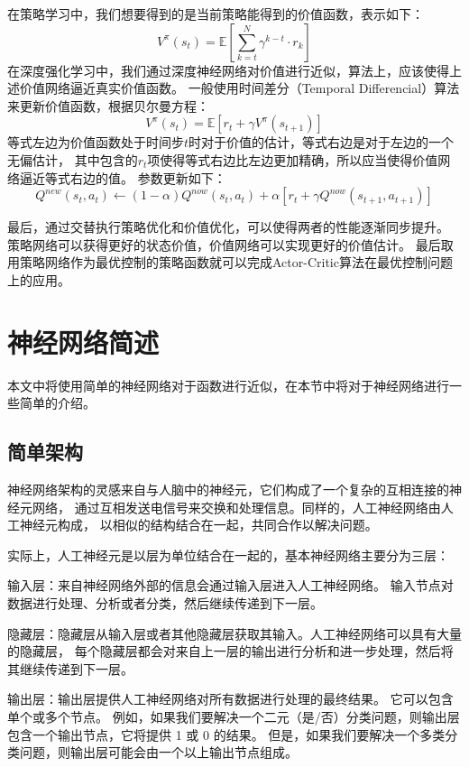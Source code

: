 \documentclass[AutoFakeBold]{LZUThesis}
\begin{document}
在策略学习中，我们想要得到的是当前策略能得到的价值函数，表示如下：
\begin{equation}
  V^\pi(s_t) = \mathbb{E} \left[ \sum_{k = t}^{N}
  \gamma^{k - t} \cdot r_k \right]
\end{equation}
在深度强化学习中，我们通过深度神经网络对价值进行近似，算法上，应该使得上述价值网络逼近真实价值函数。
一般使用时间差分（Temporal Differencial）算法来更新价值函数，根据贝尔曼方程：
\begin{equation}
  V^{\pi}(s_t) = \mathbb{E} \left[ r_t + \gamma V^\pi(s_{t + 1}) \right]
\end{equation}
等式左边为价值函数处于时间步$t$时对于价值的估计，等式右边是对于左边的一个无偏估计，
其中包含的$r_t$项使得等式右边比左边更加精确，所以应当使得价值网络逼近等式右边的值。
参数更新如下：
\begin{equation}
  Q^{new}(s_t, a_t) \leftarrow (1 - \alpha) Q^{now}(s_t, a_t) 
  + \alpha [ r_t + \gamma Q^{now}(s_{t + 1}, a_{t + 1}) ]
\end{equation}

最后，通过交替执行策略优化和价值优化，可以使得两者的性能逐渐同步提升。
策略网络可以获得更好的状态价值，价值网络可以实现更好的价值估计。
最后取用策略网络作为最优控制的策略函数就可以完成Actor-Critic算法在最优控制问题上的应用。

\section{神经网络简述}
本文中将使用简单的神经网络对于函数进行近似，在本节中将对于神经网络进行一些简单的介绍。
\subsection{简单架构}
神经网络架构的灵感来自与人脑中的神经元，它们构成了一个复杂的互相连接的神经元网络，
通过互相发送电信号来交换和处理信息。同样的，人工神经网络由人工神经元构成，
以相似的结构结合在一起，共同合作以解决问题。

实际上，人工神经元是以层为单位结合在一起的，基本神经网络主要分为三层：

输入层：来自神经网络外部的信息会通过输入层进入人工神经网络。
输入节点对数据进行处理、分析或者分类，然后继续传递到下一层。

隐藏层：隐藏层从输入层或者其他隐藏层获取其输入。人工神经网络可以具有大量的隐藏层，
每个隐藏层都会对来自上一层的输出进行分析和进一步处理，然后将其继续传递到下一层。

输出层：输出层提供人工神经网络对所有数据进行处理的最终结果。
它可以包含单个或多个节点。
例如，如果我们要解决一个二元（是/否）分类问题，则输出层包含一个输出节点，它将提供 1 或 0 的结果。
但是，如果我们要解决一个多类分类问题，则输出层可能会由一个以上输出节点组成。
\end{document}

